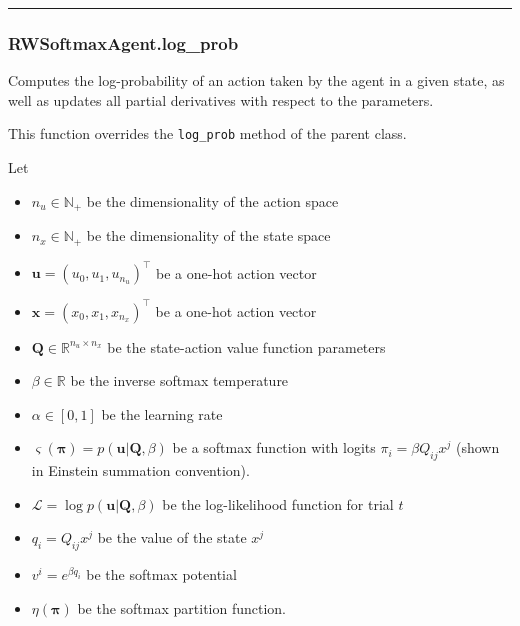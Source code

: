 \begin{center}\rule{0.5\linewidth}{\linethickness}\end{center}

\subsubsection{RWSoftmaxAgent.log\_prob}\label{rwsoftmaxagent.log_prob}

\begin{Shaded}
\begin{Highlighting}[]
\end{Highlighting}
\end{Shaded}

Computes the log-probability of an action taken by the agent in a given
state, as well as updates all partial derivatives with respect to the
parameters.

This function overrides the \texttt{log\_prob} method of the parent
class.

Let

\begin{itemize}
\tightlist
\item
  \(n_u \in \mathbb N_+\) be the dimensionality of the action space
\item
  \(n_x \in \mathbb N_+\) be the dimensionality of the state space
\item
  \(\mathbf u = (u_0, u_1, u_{n_u})^\top\) be a one-hot action vector
\item
  \(\mathbf x = (x_0, x_1, x_{n_x})^\top\) be a one-hot action vector
\item
  \(\mathbf Q \in \mathbb R^{n_u \times n_x}\) be the state-action value
  function parameters
\item
  \(\beta \in \mathbb R\) be the inverse softmax temperature
\item
  \(\alpha \in [0, 1]\) be the learning rate
\item
  \(\varsigma(\boldsymbol\pi) = p(\mathbf u | \mathbf Q, \beta)\) be a
  softmax function with logits \(\pi_i = \beta Q_{ij} x^j\) (shown in
  Einstein summation convention).
\item
  \(\mathcal L = \log p(\mathbf u | \mathbf Q, \beta)\) be the
  log-likelihood function for trial \(t\)
\item
  \(q_i = Q_{ij} x^j\) be the value of the state \(x^j\)
\item
  \(v^i = e^{\beta q_i}\) be the softmax potential
\item
  \(\eta(\boldsymbol\pi)\) be the softmax partition function.
\end{itemize}

